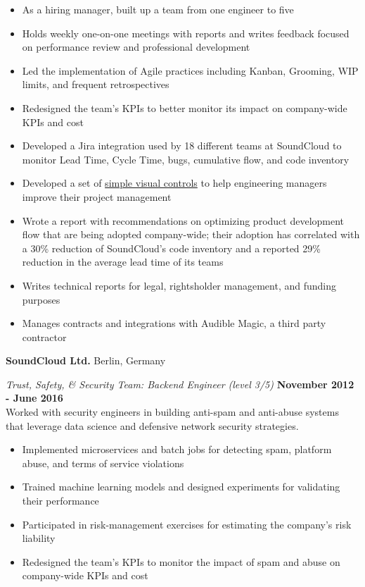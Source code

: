 \documentclass[margin,line]{res}
\newenvironment{list1}{
  \begin{list}{\ding{113}}{%
      \setlength{\itemsep}{0in}
      \setlength{\parsep}{0in} \setlength{\parskip}{0in}
      \setlength{\topsep}{0in} \setlength{\partopsep}{0in}
      \setlength{\leftmargin}{0.17in}}}{\end{list}}
\begin{document}
\begin{resume}
\begin{list1}
\begin{itemize}
\item As a hiring manager, built up a team from one engineer to five
\item Holds weekly one-on-one meetings with reports and writes feedback focused on performance review and professional development
\item Led the implementation of Agile practices including Kanban, Grooming, WIP limits, and frequent retrospectives
\item Redesigned the team's KPIs to better monitor its impact on company-wide KPIs and cost
\item Developed a Jira integration used by 18 different teams at SoundCloud to monitor Lead Time, Cycle Time, bugs, cumulative flow, and code inventory
\item Developed a set of \href{https://en.wikipedia.org/wiki/Visual_control}{simple visual controls} to help engineering managers improve their project management
\item Wrote a report with recommendations on optimizing product development flow that are being adopted company-wide; their adoption has correlated with a 30\% reduction of SoundCloud's code inventory and a reported 29\% reduction in the average lead time of its teams
\item Writes technical reports for legal, rightsholder management, and funding purposes
\item Manages contracts and integrations with Audible Magic, a third party contractor
\end{itemize}

\end{list1}

{\bf SoundCloud Ltd.} Berlin, Germany\\
\vspace*{-.1in}
\begin{list1}
\item[] {\em Trust, Safety, \& Security Team: Backend Engineer (level 3/5)} \hfill {\bf November 2012 - June 2016}\\
Worked with security engineers in building anti-spam and anti-abuse systems that leverage data science and defensive network security strategies.

\begin{itemize}
\item Implemented microservices and batch jobs for detecting spam, platform abuse, and terms of service violations
\item Trained machine learning models and designed experiments for validating their performance
\item Participated in risk-management exercises for estimating the company's risk liability
\item Redesigned the team's KPIs to monitor the impact of spam and abuse on company-wide KPIs and cost
\end{itemize}


\end{list1}
\end{resume}
\end{document}
